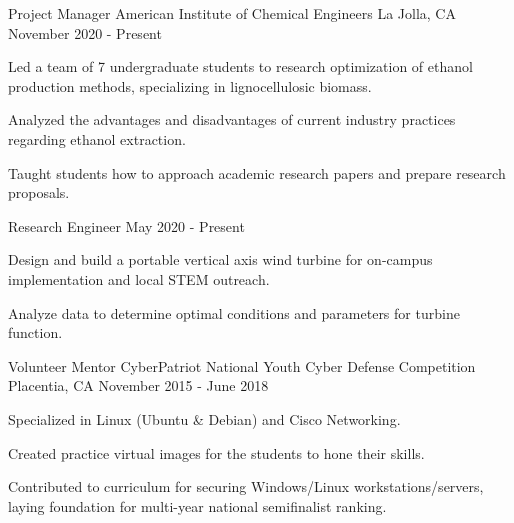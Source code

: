 \begin{cventries}
\cventrytwo
{Project Manager} %
{American Institute of Chemical Engineers} %
{La Jolla, CA} %
{November 2020 - Present} %
{
    \begin{cvitems} %
        \item {Led a team of 7 undergraduate students to research optimization of ethanol production methods, specializing in lignocellulosic biomass.}
        \item {Analyzed the advantages and disadvantages of current industry practices regarding ethanol extraction.}
        \item {Taught students how to approach academic research papers and prepare research proposals.}
      \end{cvitems}
}
    {Research Engineer} %
    {May 2020 - Present} %
    {
        \begin{cvitems} %
            \item {Design and build a portable vertical axis wind turbine for on-campus implementation and local STEM outreach.}
            \item {Analyze data to determine optimal conditions and parameters for turbine function.}
        \end{cvitems}
    }
 \cventry
    {Volunteer Mentor} %
    {CyberPatriot National Youth Cyber Defense Competition} %
    {Placentia, CA} %
    {November 2015 - June 2018} %
    {
      \begin{cvitems} %
        \item {Specialized in Linux (Ubuntu \& Debian) and Cisco Networking.}
        \item {Created practice virtual images for the students to hone their skills.}
        \item {Contributed to curriculum for securing Windows/Linux workstations/servers, laying foundation for multi-year national semifinalist ranking.}

\end{cvitems}}
\end{cventries}

